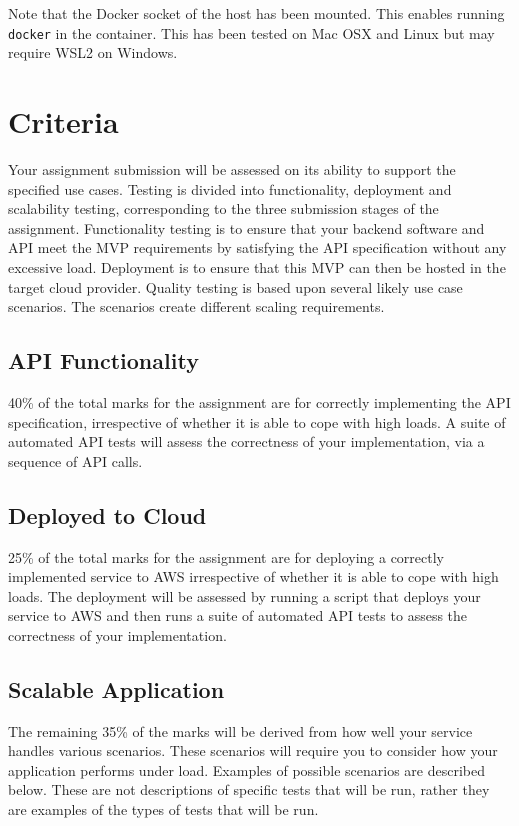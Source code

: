 \documentclass{csse4400}
\begin{document}
Note that the Docker socket of the host has been mounted. This enables running \texttt{docker} in the container. This has been tested on Mac OSX and Linux but may require WSL2 on Windows.


\section{Criteria}
Your assignment submission will be assessed on its ability to support the specified use cases.
Testing is divided into functionality, deployment and scalability testing, corresponding to the three submission stages of the assignment.
Functionality testing is to ensure that your backend software and API meet the MVP requirements by satisfying the API specification without any excessive load.
Deployment is to ensure that this MVP can then be hosted in the target cloud provider.
Quality testing is based upon several likely use case scenarios.
The scenarios create different scaling requirements.

\subsection{API Functionality} %
40\% of the total marks for the assignment are for correctly implementing the API specification, irrespective of whether it is able to cope with high loads. A suite of automated API tests will assess the correctness of your implementation, via a sequence of API calls.

\subsection{Deployed to Cloud} %
25\% of the total marks for the assignment are for deploying a correctly implemented service to AWS irrespective of whether it is able to cope with high loads.
The deployment will be assessed by running a script that deploys your service to AWS and then runs a suite of automated API tests to assess the correctness of your implementation.

\subsection{Scalable Application}\label{sec:scenarios} %
The remaining 35\% of the marks will be derived from how well your service handles various scenarios.
These scenarios will require you to consider how your application performs under load.
Examples of possible scenarios are described below.
These are not descriptions of specific tests that will be run, rather they are examples of the types of tests that will be run.
\end{document}
